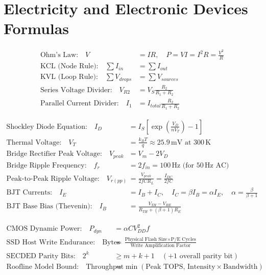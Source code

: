\chapter{Electricity and Electronic Devices Formulas}

\begin{formulabox}
\begin{align}
\text{Ohm's Law:} \quad V &= I R, \quad P = V I = I^2 R = \frac{V^2}{R} \\
\text{KCL (Node Rule):} \quad \sum I_{in} &= \sum I_{out} \\
\text{KVL (Loop Rule):} \quad \sum V_{drops} &= \sum V_{sources} \\
\text{Series Voltage Divider:} \quad V_{R2} &= V_S \frac{R_2}{R_1 + R_2} \\
\text{Parallel Current Divider:} \quad I_1 &= I_{total} \frac{R_2}{R_1 + R_2}
\end{align}
\end{formulabox}

\begin{formulabox}
\begin{align}
\text{Shockley Diode Equation:} \quad I_D &= I_S \left[ \exp\left(\frac{V_D}{n V_T}\right) - 1 \right] \\
\text{Thermal Voltage:} \quad V_T &= \frac{k_B T}{q} \approx 25.9\,\text{mV at } 300\,\text{K} \\
\text{Bridge Rectifier Peak Voltage:} \quad V_{peak} &= V_m - 2 V_D \\
\text{Bridge Ripple Frequency:} \quad f_r &= 2 f_{in} = 100\,\text{Hz (for } 50\,\text{Hz AC)} \\
\text{Peak-to-Peak Ripple Voltage:} \quad V_{r(pp)} &= \frac{V_{peak}}{2 f C R_L} = \frac{I_{DC}}{2 f C} \\
\text{BJT Currents:} \quad I_E &= I_B + I_C, \quad I_C = \beta I_B = \alpha I_E, \quad \alpha = \frac{\beta}{\beta + 1} \\
\text{BJT Base Bias (Thevenin):} \quad I_B &= \frac{V_{TH} - V_{BE}}{R_{TH} + (\beta + 1)R_E}
\end{align}
\end{formulabox}

\begin{formulabox}
\begin{align}
\text{CMOS Dynamic Power:} \quad P_{dyn} &= \alpha C V_{DD}^2 f \\
\text{SSD Host Write Endurance:} \quad \text{Bytes} &= \frac{\text{Physical Flash Size} \times \text{P/E Cycles}}{\text{Write Amplification Factor}} \\
\text{SECDED Parity Bits:} \quad 2^k &\ge m + k + 1 \quad (+1 \text{ overall parity bit}) \\
\text{Roofline Model Bound:} \quad \text{Throughput} &= \min(\text{Peak TOPS}, \, \text{Intensity} \times \text{Bandwidth})
\end{align}
\end{formulabox}
